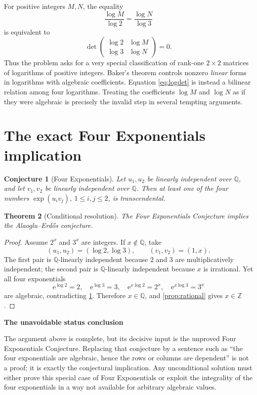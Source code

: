 \documentclass[11pt,oneside]{article}
\newtheorem{theorem}{Theorem}[section]
\newtheorem{conjecture}[theorem]{Conjecture}
\theoremstyle{definition}
\theoremstyle{remark}
\newenvironment{redbox}[1]{%
  \def\FrameCommand{\fcolorbox{deepred}{softgray}}%
  \MakeFramed{\advance\hsize-2\width\FrameRestore}%
  \noindent\textbf{#1}\par\smallskip
}{\endMakeFramed}
\newcommand{\Z}{\mathbb Z}
\newcommand{\Q}{\mathbb Q}
\newcommand{\AEconj}{Alaoglu--Erd\H{o}s}
\newcommand{\fourE}{Four Exponentials Conjecture}
\newcommand{\e}{\mathrm e}
\begin{document}
For positive integers $M,N$, the equality
\[
  \frac{\log M}{\log 2}=\frac{\log N}{\log 3}
\]
is equivalent to
\begin{equation}
  \det\begin{pmatrix}
  \log 2&\log M\\
  \log 3&\log N
  \end{pmatrix}=0.
  \label{eq:logdet}
\end{equation}
Thus the problem asks for a very special classification of rank-one
$2\times2$ matrices of logarithms of positive integers.  Baker's theorem
controls nonzero \emph{linear} forms in logarithms with algebraic
coefficients.  Equation \eqref{eq:logdet} is instead a bilinear relation among
four logarithms.  Treating the coefficients $\log M$ and $\log N$ as if they
were algebraic is precisely the invalid step in several tempting arguments.

\section{The exact Four Exponentials implication}

\begin{conjecture}[Four Exponentials]
\label{conj:4e}
Let $u_1,u_2$ be linearly independent over $\Q$, and let $v_1,v_2$ be
linearly independent over $\Q$.  Then at least one of the four numbers
$\exp(u_iv_j)$, $1\le i,j\le2$, is transcendental.
\end{conjecture}

\begin{theorem}[Conditional resolution]
\label{thm:4e}
The \fourE{} implies the \AEconj{} conjecture.
\end{theorem}

\begin{proof}
Assume $2^x$ and $3^x$ are integers.  If $x\notin\Q$, take
\[
  (u_1,u_2)=(\log2,\log3),\qquad (v_1,v_2)=(1,x).
\]
The first pair is $\Q$-linearly independent because $2$ and $3$ are
multiplicatively independent; the second pair is $\Q$-linearly independent
because $x$ is irrational.  Yet all four exponentials
\[
  \e^{\log2}=2,\quad \e^{\log3}=3,\quad
  \e^{x\log2}=2^x,\quad \e^{x\log3}=3^x
\]
are algebraic, contradicting \cref{conj:4e}.  Therefore $x\in\Q$, and
\cref{prop:rational} gives $x\in\Z$.
\end{proof}

\begin{redbox}{The unavoidable status conclusion}
The argument above is complete, but its decisive input is the unproved
\fourE{}.  Replacing that conjecture by a sentence such as ``the four
exponentials are algebraic, hence the rows or columns are dependent'' is not a
proof; it is exactly the conjectural implication.  Any unconditional solution
must either prove this special case of Four Exponentials or exploit the
integrality of the four exponentials in a way not available for arbitrary
algebraic values.
\end{redbox}
\end{document}
